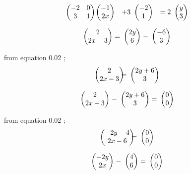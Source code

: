\documentclass[journal,12pt,twocolumn]{IEEEtran}
\theoremstyle{remark}
\newcommand{\myvec}[1]{\ensuremath{\begin{pmatrix}#1\end{pmatrix}}}
\numberwithin{equation}{subsection}
\begin{document}
    \begin{align}
&\ \myvec{-2 & 0\\3 & 1}& \hspace{-0.5cm}
&\ \myvec{-1\\2x}&  
 + 3&\ \myvec{-2 \\1 }& 
 = 2&\ \myvec{y \\3 }& 
      \end{align} 
      
      \vspace{1cm}
         \begin{align}
&\ \myvec{2\\2x-3 }& \hspace{-0.25cm} =
&\ \myvec{2y\\6} & \hspace{-0.25cm}- 
&\ \myvec{-6\\3} &
\end{align} 
      
       \vspace{1cm}
       from equation 0.02 ;
             \vspace{0.25cm}
      \begin{align}
&\ \myvec{2\\2x-3 }& \hspace{-0.5cm} =
&\ \myvec{2y+6\\3} & 
\end{align} 
      
     \begin{align}
&\ \myvec{2\\2x-3 }& \hspace{-0.25cm} -
&\ \myvec{2y+6\\3} & \hspace{-0.25cm}= 
&\ \myvec{0\\0} &
\end{align} 
      
      \vspace{1cm}
       from equation 0.02 ;
             \vspace{0.25cm}
      \begin{align}
&\ \myvec{-2y-4\\2x-6 }& \hspace{-0.5cm} =
&\ \myvec{0\\0} & 
\end{align} 
      
     \begin{align}
&\ \myvec{-2y\\2x }& \hspace{-0.25cm} -
&\ \myvec{4\\6} & \hspace{-0.25cm}= 
&\ \myvec{0\\0} &
\end{align} 
      
\end{document}

